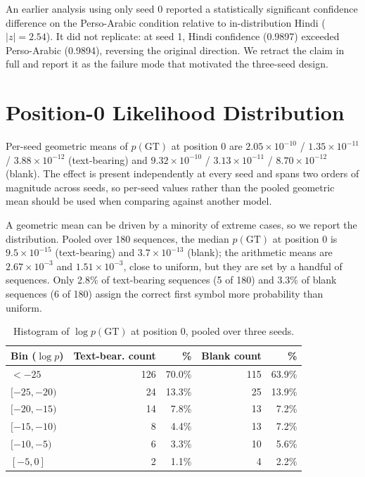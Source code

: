 \documentclass{article}
\begin{document}
An earlier analysis using only seed 0 reported a statistically significant confidence
difference on the Perso-Arabic condition relative to in-distribution Hindi ($|z| = 2.54$). It
did not replicate: at seed 1, Hindi confidence (0.9897) exceeded Perso-Arabic (0.9894),
reversing the original direction. We retract the claim in full and report it as the failure
mode that motivated the three-seed design.

\section{Position-0 Likelihood Distribution}
\label{app:pos0}

Per-seed geometric means of $p(\mathrm{GT})$ at position 0 are $2.05\times10^{-10}$ /
$1.35\times10^{-11}$ / $3.88\times10^{-12}$ (text-bearing) and $9.32\times10^{-10}$ /
$3.13\times10^{-11}$ / $8.70\times10^{-12}$ (blank). The effect is present independently at
every seed and spans two orders of magnitude across seeds, so per-seed values rather than the
pooled geometric mean should be used when comparing against another model.

A geometric mean can be driven by a minority of extreme cases, so we report the distribution.
Pooled over 180 sequences, the median $p(\mathrm{GT})$ at position 0 is $9.5\times10^{-15}$
(text-bearing) and $3.7\times10^{-13}$ (blank); the arithmetic means are $2.67\times10^{-3}$ and
$1.51\times10^{-3}$, close to uniform, but they are set by a handful of sequences. Only
2.8\% of text-bearing sequences (5 of 180) and 3.3\% of blank sequences (6 of 180) assign the correct
first symbol more probability than uniform.

\begin{table}[h]
\small
\centering
\caption{Histogram of $\log p(\mathrm{GT})$ at position 0, pooled over three seeds.}
\begin{tabular}{lrrrr}
\toprule
Bin ($\log p$) & Text-bear. count & \% & Blank count & \% \\
\midrule
$< -25$        & 126 & 70.0\% & 115 & 63.9\% \\
$[-25, -20)$   & 24  & 13.3\% & 25  & 13.9\% \\
$[-20, -15)$   & 14  & 7.8\%  & 13  & 7.2\%  \\
$[-15, -10)$   & 8   & 4.4\%  & 13  & 7.2\%  \\
$[-10, -5)$    & 6   & 3.3\%  & 10  & 5.6\%  \\
$[-5, 0]$      & 2   & 1.1\%  & 4   & 2.2\%  \\
\bottomrule
\end{tabular}
\end{table}
\end{document}
